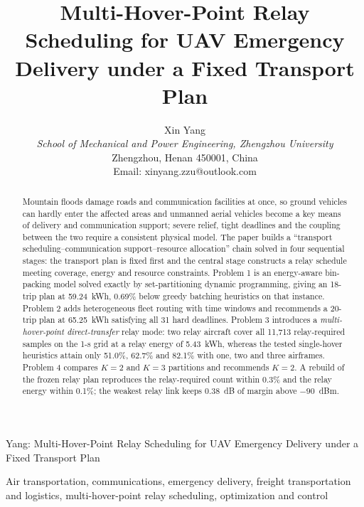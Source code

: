 \documentclass[journal]{IEEEtran}
\begin{document}
\title{Multi-Hover-Point Relay Scheduling for UAV Emergency Delivery under a
Fixed Transport Plan}

\author{Xin Yang\\
\textit{School of Mechanical and Power Engineering, Zhengzhou University}\\
Zhengzhou, Henan 450001, China\\
Email: xinyang.zzu@outlook.com
}

\maketitle
{}%
{Yang: Multi-Hover-Point Relay Scheduling for UAV Emergency Delivery under a Fixed Transport Plan}

\begin{abstract}
Mountain floods damage roads and communication facilities at once, so ground
vehicles can hardly enter the affected areas and unmanned aerial vehicles become a key means of
delivery and communication support; severe relief, tight deadlines and the
coupling between the two require a consistent physical model. The paper builds a
``transport scheduling--communication support--resource allocation'' chain solved
in four sequential stages: the transport plan is fixed first and the central stage
constructs a relay schedule meeting coverage, energy and resource constraints.
Problem 1 is an energy-aware bin-packing model solved exactly by
set-partitioning dynamic programming, giving an 18-trip plan at 59.24~kWh,
0.69\% below greedy batching heuristics on that instance. Problem 2
adds heterogeneous fleet routing with time windows and recommends a
20-trip plan at 65.25~kWh satisfying all 31 hard deadlines. Problem 3 introduces
a \emph{multi-hover-point direct-transfer} relay mode: two relay aircraft cover all
11,713 relay-required samples on the 1-s grid
at a relay energy of 5.43~kWh, whereas the tested single-hover heuristics attain
only 51.0\%, 62.7\% and 82.1\% with one, two and three airframes. Problem 4
compares $K{=}2$ and $K{=}3$ partitions and
recommends $K{=}2$. A rebuild of the frozen relay plan reproduces the
relay-required count within 0.3\% and the relay energy within 0.1\%; the weakest
relay link keeps 0.38~dB of margin above $-90$~dBm.
\end{abstract}

\begin{IEEEkeywords}
Air transportation, communications, emergency delivery, freight transportation
and logistics, multi-hover-point relay scheduling, optimization and control
\end{IEEEkeywords}
\end{document}
